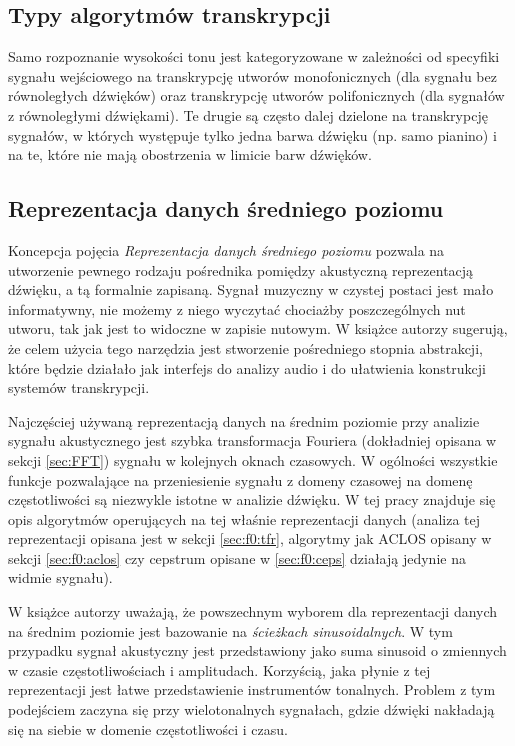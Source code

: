 \documentclass[12pt,a4paper,twoside]{mwart}
\begin{document}
\subsection{Typy algorytmów transkrypcji}
Samo rozpoznanie wysokości tonu jest kategoryzowane w zależności od specyfiki sygnału wejściowego na transkrypcję utworów monofonicznych (dla sygnału bez równoległych dźwięków) oraz transkrypcję utworów polifonicznych (dla sygnałów z równoległymi dźwiękami). Te drugie są często dalej dzielone na transkrypcję sygnałów, w których występuje tylko jedna barwa dźwięku (np. samo pianino) i na te, które nie mają obostrzenia w limicie barw dźwięków.

\subsection{Reprezentacja danych średniego poziomu}
Koncepcja pojęcia \textit{Reprezentacja danych średniego poziomu} pozwala na utworzenie pewnego rodzaju pośrednika pomiędzy akustyczną reprezentacją dźwięku, a tą formalnie zapisaną. Sygnał muzyczny w czystej postaci jest mało informatywny, nie możemy z niego wyczytać chociażby poszczególnych nut utworu, tak jak jest to widoczne w zapisie nutowym. W książce \cite{Transcription:Zatorre:AuditoryCortex} autorzy sugerują, że celem użycia tego narzędzia jest stworzenie pośredniego stopnia abstrakcji, które będzie działało jak interfejs do analizy audio i do ułatwienia konstrukcji systemów transkrypcji.

Najczęściej używaną reprezentacją danych na średnim poziomie przy analizie sygnału akustycznego jest szybka transformacja Fouriera (dokładniej opisana w sekcji \ref{sec:FFT}) sygnału w kolejnych oknach czasowych. W ogólności wszystkie funkcje pozwalające na przeniesienie sygnału z domeny czasowej na domenę częstotliwości są niezwykle istotne w analizie dźwięku. W tej pracy znajduje się opis algorytmów operujących na tej właśnie reprezentacji danych (analiza tej reprezentacji opisana jest w sekcji \ref{sec:f0:tfr}, algorytmy jak ACLOS opisany w sekcji \ref{sec:f0:aclos} czy cepstrum opisane w \ref{sec:f0:ceps} działają jedynie na widmie sygnału).

W książce \cite{Transcription:Zatorre:AuditoryCortex} autorzy uważają, że powszechnym wyborem dla reprezentacji danych na średnim poziomie jest bazowanie na \textit{ścieżkach sinusoidalnych}. W tym przypadku sygnał akustyczny jest przedstawiony jako suma sinusoid o zmiennych w czasie częstotliwościach i amplitudach. Korzyścią, jaka płynie z tej reprezentacji jest łatwe przedstawienie instrumentów tonalnych. Problem z tym podejściem zaczyna się przy wielotonalnych sygnałach, gdzie dźwięki nakładają się na siebie w domenie częstotliwości i czasu. 
\end{document}
